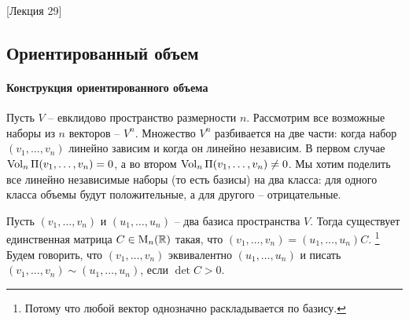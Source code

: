 [Лекция 29]


\subsection{Ориентированный объем}

\paragraph{Конструкция ориентированного объема}

Пусть $V$ -- евклидово пространство размерности $n$.
Рассмотрим все возможные наборы из $n$ векторов -- $V^n$.
Множество $V^n$ разбивается на две части: когда набор $(v_1,\ldots,v_n)$ линейно зависим и когда он линейно независим.
В первом случае $\operatorname{Vol}_n\Pi(v_1,\ldots,v_n) = 0$, а во втором $\operatorname{Vol}_n\Pi(v_1,\ldots,v_n)\neq 0$.
Мы хотим поделить все линейно независимые наборы (то есть базисы) на два класса: для одного класса объемы будут положительные, а для другого -- отрицательные.

\begin{definition}
Пусть $(v_1,\ldots,v_n)$ и $(u_1,\ldots,u_n)$ -- два базиса пространства $V$.
Тогда существует единственная матрица $C\in \operatorname{M}_{n}(\mathbb R)$ такая, что $(v_1,\ldots,v_n) = (u_1,\ldots,u_n)C$.%
\footnote{Потому что любой вектор однозначно раскладывается по базису.}
Будем говорить, что $(v_1,\ldots,v_n)$ эквивалентно $(u_1,\ldots,u_n)$ и писать $(v_1,\ldots,v_n)\sim(u_1,\ldots,u_n)$, если $\det C > 0$.
\end{definition}

